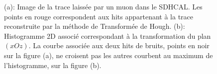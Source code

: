 \begin {enumerate}[~~1-]
\begin{figure}[!ht]
  \caption{(a): Image de la trace laissée par un muon dans le SDHCAL. Les points en rouge correspondent aux hits appartenant à la trace reconstruite par la méthode de Transformée de Hough. (b): Histogramme 2D associé correspondant à la transformation du plan $(xOz)$. La courbe associée aux deux hits de bruits, points en noir sur la figure (a), ne croisent pas les autres courbent au maximum de l'histogramme, sur la figure (b).}
  \label{fig.ht_muon}
\end{figure}

\end{enumerate}
